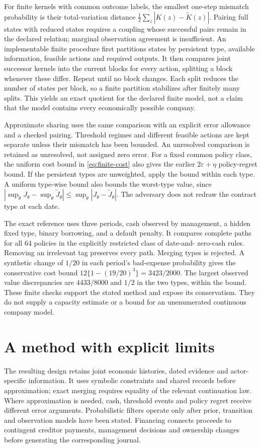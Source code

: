 \documentclass[11pt,a4paper]{article}
\begin{document}
For finite kernels with common outcome labels, the smallest one-step mismatch
probability is their total-variation distance
$\frac12\sum_z|K(z)-\widetilde K(z)|$. Pairing full states with reduced states
requires a coupling whose successful pairs remain in the declared relation;
marginal observation agreement is insufficient. An implementable finite
procedure first partitions states by persistent type, available information,
feasible actions and required outputs. It then compares joint successor
kernels into the current blocks for every action, splitting a block whenever
these differ. Repeat until no block changes. Each split reduces the number of
states per block, so a finite partition stabilizes after finitely many splits.
This yields an exact quotient for the declared finite model, not a claim that
the model contains every economically possible company.

Approximate sharing uses the same comparison with an explicit error allowance
and a checked pairing. Threshold regimes and different feasible actions are
kept separate unless their mismatch has been bounded. An unresolved comparison
is retained as unresolved, not assigned zero error. For a fixed common policy
class, the uniform cost bound in \eqref{eq:finite-cost} also gives the earlier
$2\varepsilon+\eta$ policy-regret bound. If the persistent types are unweighted,
apply the bound within each type. A uniform type-wise bound also bounds the
worst-type value, since
$|\sup_\theta J_\theta-\sup_\theta\widetilde J_\theta|
\le\sup_\theta|J_\theta-\widetilde J_\theta|$.
The adversary does not redraw the contract type at each date.

The exact reference uses three periods, cash observed by management, a hidden
fixed type, binary borrowing, and a default penalty. It compares complete
paths for all 64 policies in the explicitly restricted class of date-and-
zero-cash rules. Removing an irrelevant tag preserves every path. Merging
types is rejected. A synthetic change of $1/20$ in each period's bad-expense
probability gives the conservative cost bound
$12\{1-(19/20)^3\}=3423/2000$. The largest observed value discrepancies are
$4433/8000$ and $1/2$ in the two types, within the bound. These finite checks
support the stated method and expose its conservatism. They do not supply a
capacity estimate or a bound for an unenumerated continuous company model.

\section{A method with explicit limits}
The resulting design retains joint economic histories, dated evidence and
actor-specific information. It uses symbolic constraints and shared records
before approximation; exact merging requires equality of the relevant
continuation law. Where approximation is needed, cash, threshold events and
policy regret receive different error arguments. Probabilistic filters operate
only after prior, transition and observation models have been stated.
Financing connects proceeds to contingent creditor payments, management
decisions and ownership changes before generating the corresponding journal.
\end{document}
